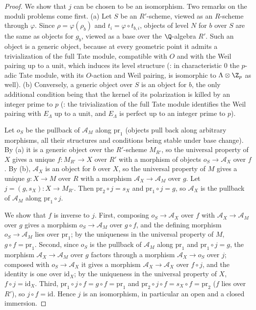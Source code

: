 \begin{proof}
We show that $j$ can be chosen to be an isomorphism. Two remarks on the moduli problems come
first. (a) Let $S$ be an $R'$-scheme, viewed as an $R$-scheme through $\varphi$. Since
$\rho=\varphi(\rho_b)$ and $t_i=\varphi\circ t_{b,i}$, objects of level $N$ for $b$ over $S$ are the
same as objects for $g_b$, viewed as a base over the $\Q$-algebra $R'$. Such an object is a generic
object, because at every geometric point it admits a trivialization of the full Tate module,
compatible with $O$ and with the Weil pairing up to a unit, which induces its level structure
(: in characteristic $0$ the $p$-adic Tate module,
with its $O$-action and Weil pairing, is isomorphic to $\Lambda\otimes\Z_p$ as well). (b)
Conversely, a generic object over $S$ is an object for $b$, the only additional condition being
that the kernel of its polarization is killed by an integer prime to $p$
(: the trivialization of the
full Tate module identifies the Weil pairing with $E_\Lambda$ up to a unit, and $E_\Lambda$ is perfect
up to an integer prime to $p$).

Let $o_S$ be the pullback of $\mathcal A_M$ along $\mathrm{pr}_1$ (objects pull back along arbitrary
morphisms, all their structures and conditions being stable under base change). By (a) it is a generic object over the
$R'$-scheme $M_{R'}$, so the universal property of $X$ gives a unique $f\colon M_{R'}\to X$ over $R'$
with a morphism of objects $o_S\to\mathcal A_X$ over $f$. By (b), $\mathcal A_X$ is an object for $b$
over $X$, so the universal property of $M$ gives a unique $g\colon X\to M$ over $R$ with a morphism
$\mathcal A_X\to\mathcal A_M$ over $g$. Let $j=(g,s_X)\colon X\to M_{R'}$. Then
$\mathrm{pr}_2\circ j=s_X$ and $\mathrm{pr}_1\circ j=g$, so $\mathcal A_X$ is the pullback of
$\mathcal A_M$ along $\mathrm{pr}_1\circ j$.

We show that $f$ is inverse to $j$. First, composing $o_S\to\mathcal A_X$ over $f$ with $\mathcal
A_X\to\mathcal A_M$ over $g$ gives a morphism $o_S\to\mathcal A_M$ over $g\circ f$, and the defining
morphism $o_S\to\mathcal A_M$ lies over $\mathrm{pr}_1$; by the uniqueness in the universal property
of $M$, $g\circ f=\mathrm{pr}_1$. Second, since $o_S$ is the pullback of $\mathcal A_M$ along
$\mathrm{pr}_1$ and $\mathrm{pr}_1\circ j=g$, the morphism $\mathcal A_X\to\mathcal A_M$ over $g$
factors through a morphism $\mathcal A_X\to o_S$ over $j$; composed with $o_S\to\mathcal A_X$ it
gives a morphism $\mathcal A_X\to\mathcal A_X$ over $f\circ j$, and the identity is one over
$\mathrm{id}_X$; by the uniqueness in the universal property of $X$, $f\circ j=\mathrm{id}_X$. Third,
$\mathrm{pr}_1\circ j\circ f=g\circ f=\mathrm{pr}_1$ and $\mathrm{pr}_2\circ j\circ f=s_X\circ
f=\mathrm{pr}_2$ ($f$ lies over $R'$), so $j\circ f=\mathrm{id}$. Hence $j$ is an isomorphism, in
particular an open and a closed immersion.
\end{proof}

